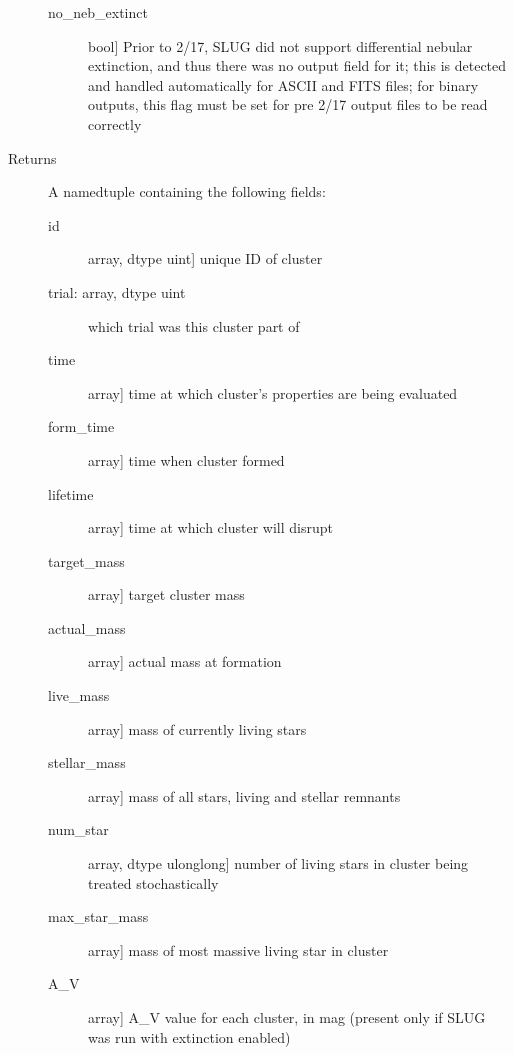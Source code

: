 \documentclass[letterpaper,10pt,english]{sphinxmanual}
\begin{document}
\begin{fulllineitems}
\begin{description}
\begin{description}
\item[{no\_neb\_extinct}] \leavevmode{[}bool{]}
Prior to 2/17, SLUG did not support differential nebular
extinction, and thus there was no output field for it; this
is detected and handled automatically for ASCII and FITS
files; for binary outputs, this flag must be set for pre
2/17 output files to be read correctly

\end{description}

\item[{Returns}] \leavevmode
A namedtuple containing the following fields:
\begin{description}
\item[{id}] \leavevmode{[}array, dtype uint{]}
unique ID of cluster

\item[{trial: array, dtype uint}] \leavevmode
which trial was this cluster part of

\item[{time}] \leavevmode{[}array{]}
time at which cluster’s properties are being evaluated

\item[{form\_time}] \leavevmode{[}array{]}
time when cluster formed

\item[{lifetime}] \leavevmode{[}array{]}
time at which cluster will disrupt

\item[{target\_mass}] \leavevmode{[}array{]}
target cluster mass

\item[{actual\_mass}] \leavevmode{[}array{]}
actual mass at formation

\item[{live\_mass}] \leavevmode{[}array{]}
mass of currently living stars

\item[{stellar\_mass}] \leavevmode{[}array{]}
mass of all stars, living and stellar remnants

\item[{num\_star}] \leavevmode{[}array, dtype ulonglong{]}
number of living stars in cluster being treated stochastically

\item[{max\_star\_mass}] \leavevmode{[}array{]}
mass of most massive living star in cluster

\item[{A\_V}] \leavevmode{[}array{]}
A\_V value for each cluster, in mag (present only if SLUG was
run with extinction enabled)


\end{description}
\end{description}
\end{fulllineitems}
\end{document}
